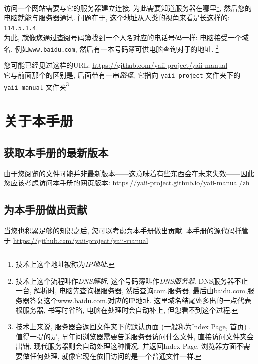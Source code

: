 访问一个网站需要与它的服务器建立连接, 为此需要知道服务器在哪里\footnote{技术上这个地址被称为\textit{IP地址}. }, 然后您的电脑就能与服务器通讯. 问题在于, 这个地址从人类的视角来看是长这样的: \verb|114.5.1.4|. \\
为此, 就像您通过查阅号码簿找到一个人名对应的电话号码一样: 电脑接受一个域名, 例如\verb|www.baidu.com|, 然后有一本号码簿可供电脑查询对于的地址. \footnote{技术上这个流程叫作\textit{DNS解析}, 这个号码簿叫作\textit{DNS服务器}. DNS服务器不止一台, 解析时, 电脑先查询根服务器, 然后查询com.服务器, 最后由baidu.com.服务器答复这个www.baidu.com.对应的IP地址. 这里域名结尾处多出的一点代表根服务器, 书写时省略, 电脑在处理时会自动补上, 但您看不到这个过程. }

您可能已经见过这样的URL: \url{https://github.com/yaii-project/yaii-manual} \\
它与前面那个的区别是, 后面带有一串\textit{路径}, 它指向 \verb|yaii-project| 文件夹下的  \verb|yaii-manual| 文件夹\footnote{技术上来说, 服务器会返回文件夹下的默认页面 (一般称为Index Page, 首页) . 值得一提的是, 早年间浏览器需要告诉服务器访问什么文件, 直接访问文件夹会出错, 现代服务器则会自动处理这种情况, 并返回Index Page. 浏览器方面不需要做任何处理, 就像它现在依旧访问的是一个普通文件一样. }

\section{关于本手册}

\subsection{获取本手册的最新版本}

由于您阅览的文件可能并非最新版本------这意味着有些东西会在未来失效------因此您应该考虑访问本手册的网页版本: \url{https://yaii-project.github.io/yaii-manual/zh}

\subsection{为本手册做出贡献}

当您也积累足够的知识之后, 您可以考虑为本手册做出贡献. 本手册的源代码托管于 \url{https://github.com/yaii-project/yaii-manual}

\endinput
